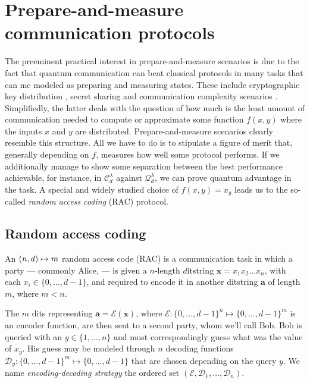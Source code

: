     \section{Prepare-and-measure communication protocols}
    \label{sec:communication-protocols}

        The preeminent practical interest in prepare-and-measure scenarios is due to the fact that quantum communication can beat classical protocols in many tasks that can me modeled as preparing and measuring states. These include cryptographic key distribution \cite{pawlowski_pamqkd_2011}, secret sharing \cite{schmid_secret_2005} and communication complexity scenarios \cite{buhrman_communicationreview_2010}. Simplifiedly, the latter deals with the question of how much is the least amount of communication needed to compute or approximate some function $f(x,y)$ where the inputs $x$ and $y$ are distributed. Prepare-and-measure scenarios clearly resemble this structure. All we have to do is to stipulate a figure of merit that, generally depending on $f$, measures how well some protocol performs. If we additionally manage to show some separation between the best performance achievable, for instance, in $\mathcal{C}_d^\lambda$ against $\mathcal{Q}_d^\lambda$, we can prove quantum advantage in the task. A special and widely studied choice of $f(x,y) = x_y$ leads us to the so-called \emph{random access coding} (RAC) protocol.

        \subsection{Random access coding}
        \label{sec:racs}

            An $\left( n, d \right) \mapsto m$ random access code (RAC) is a communication task in which a party --- commonly Alice, --- is given a $n$-length $d$itstring $\mathbf{x} = x_1 x_2 \ldots x_n$, with each $x_i \in \{0, \ldots, d - 1 \}$, and required to encode it in another ditstring $\mathbf{a}$ of length $m$, where $m < n$.

            The $m$ dits representing $\mathbf{a} = \mathcal{E}(\mathbf{x})$, where $\mathcal{E} : \{0, \ldots, d - 1\}^n \mapsto \{0, \ldots, d - 1\}^m$ is an encoder function, are then sent to a second party, whom we'll call Bob. Bob is queried with an $y \in \{1, \ldots, n\}$ and must correspondingly guess what was the value of $x_y$. His guess may be modeled through $n$ decoding functions $\mathcal{D}_y : \{0, \ldots, d - 1\}^m \mapsto \{0, \ldots, d - 1\}$ that are chosen depending on the query $y$. We name \textit{encoding-decoding strategy} the ordered set $(\mathcal{E}, \mathcal{D}_{1},\ldots,\mathcal{D}_{n})$.


